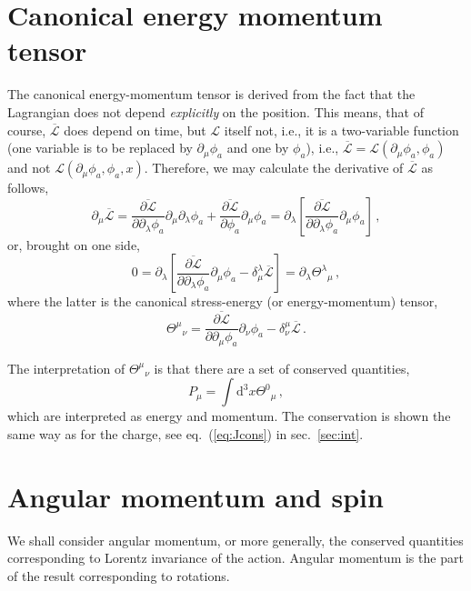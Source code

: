 \documentclass[a4paper,12pt]{article}
\def\d{\mathrm{d}}
\def\lag{{\mathcal{L}}}
\begin{document}
\section{Canonical energy momentum tensor}\label{sec:EMcan}
The canonical energy-momentum tensor is derived from the fact that the Lagrangian does not depend \emph{explicitly} on the position. This means, that of course, $\overline{\lag}$ does depend on time, but $\lag$ itself not, i.e., it is a two-variable function (one variable is to be replaced by $\partial_\mu\phi_a$ and one by $\phi_a$), i.e., $\overline{\lag}=\lag(\partial_\mu\phi_a, \phi_a)$ and not $\lag(\partial_\mu\phi_a, \phi_a, x)$. Therefore, we may calculate the derivative of $\overline{\lag}$ as follows,
\begin{equation}\label{eq:DST}
 \partial_\mu \overline{\lag} = \overline{\frac{\partial\lag}{\partial\partial_\lambda\phi_a}} \partial_\mu\partial_\lambda\phi_a + \overline{\frac{\partial\lag}{\partial\phi_a}}\partial_\mu \phi_a = 
 \partial_\lambda\left[ \overline{\frac{\partial\lag}{\partial\partial_\lambda\phi_a}} \partial_\mu\phi_a\right]\,,
\end{equation}
or, brought on one side,
\begin{equation}\label{eq:DST0}
 0 =  \partial_\lambda\left[ \overline{\frac{\partial\lag}{\partial\partial_\lambda\phi_a}} \partial_\mu\phi_a -\delta^\lambda_\mu \overline{\lag}\right] =\partial_\lambda\Theta^\lambda{}_\mu\,,
\end{equation}
where the latter is the canonical stress-energy (or energy-momentum) tensor,
\begin{equation}\label{eq:EMcan}
 \Theta^\mu{}_\nu = \overline{\frac{\partial\lag}{\partial\partial_\mu\phi_a}} \partial_\nu\phi_a -\delta^\mu_\nu \overline{\lag}\,.
\end{equation}

The interpretation of $\Theta^\mu{}_\nu$ is that there are a set of conserved quantities,
\begin{equation}\label{eq:momcons}
 P_\mu = \int \d^3 x \Theta^0{}_\mu\,,
\end{equation}
which are interpreted as energy and momentum. The conservation is shown the same way as for the charge, see eq.\ (\ref{eq:Jcons}) in sec.\ \ref{sec:int}.

\section{Angular momentum and spin}\label{eq:angmom}
We shall consider angular momentum, or more generally, the conserved quantities corresponding to Lorentz invariance of the action. Angular momentum is the part of the result corresponding to rotations.
\end{document}
